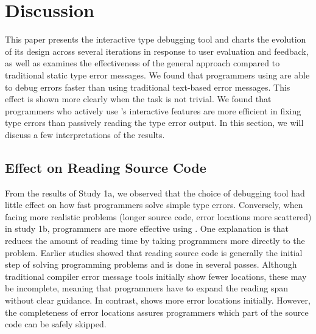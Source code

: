 \section{Discussion}


This paper presents the interactive type debugging tool \chameleon{} and charts the evolution of its design across several iterations in response to user evaluation and feedback, as well as examines   the effectiveness of the general approach compared to traditional static type error messages. We found that programmers using \chameleon{} are able to debug errors faster than using traditional text-based error messages. This effect is shown more clearly when the task is not trivial. We found that programmers who actively use \chameleon{}'s interactive features are more efficient in fixing type errors than passively reading the type error output. In this section, we will discuss a few interpretations of the results.


\subsection{Effect on Reading Source Code}
From the results of Study 1a, we observed that the choice of debugging tool had little effect on how fast programmers solve simple type errors. Conversely, when facing more realistic problems (longer source code, error locations more scattered) in study 1b, programmers are more effective using \chameleon{}. One explanation is that \chameleon{} reduces the amount of reading time by taking programmers more directly to the problem. Earlier studies \cite{Jbara2015-gr, Peitek2020-nb} showed that reading source code is generally the initial step of solving programming problems and is done in several passes. Although traditional compiler error message tools initially show fewer locations, these may be incomplete, meaning that programmers have to expand the reading span without clear guidance. In contrast, \chameleon{} shows more error locations initially. However, the completeness of error locations assures programmers which part of the source code can be safely skipped.

